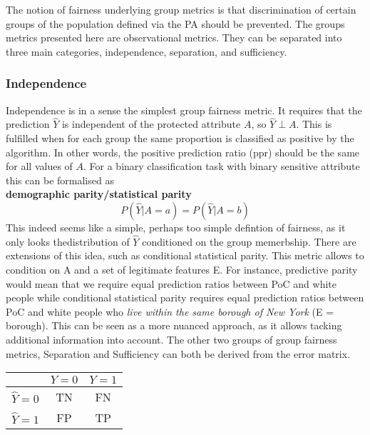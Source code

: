 The notion of fairness underlying group metrics is that discrimination of certain groups of the population defined via the PA should be prevented. The groups metrics presented here are observational metrics. They can be separated into three main categories, independence, separation, and sufficiency. 

\subsubsection*{Independence}
Independence is in a sense the simplest group fairness metric. It requires that the prediction $\hat{Y}$ is independent of the protected attribute $A$, so $\hat{Y} \perp A$. This is fulfilled when for each group the same proportion is classified as positive by the algorithm. In other words, the positive prediction ratio (ppr) should be the same for all values of $A$. For a binary classification task with binary sensitive attribute this can be formalised as \\
\textbf{demographic parity/statistical parity}
$$P(\hat{Y} | A = a) = P(\hat{Y} | A = b)$$
This indeed seems like a simple, perhaps too simple defintion of fairness, as it only looks thedistribution of $\hat{Y}$ conditioned on the group memerbship. There are extensions of this idea, such as conditional statistical parity. This metric allows to condition on A and a set of legitimate features E. For instance, predictive parity would mean that we require equal prediction ratios between PoC and white people while conditional statistical parity requires equal prediction ratios between PoC and white people who \textit{live within the same borough of New York} (E = borough). This can be seen as a more nuanced approach, as it allows tacking additional information into account.
The other two groups of group fairness metrics, Separation and Sufficiency can both be derived from the error matrix.
\begin{center}
    \renewcommand{\arraystretch}{1.5}  %
    \begin{tabular}{c|c|c|}
        \hline
        & \(Y = 0\) & \(Y = 1\) \\
        \hline
        \(\hat{Y} = 0\) & TN & FN \\
        \hline
        \(\hat{Y} = 1\) & FP & TP \\
    \end{tabular}
\end{center}

